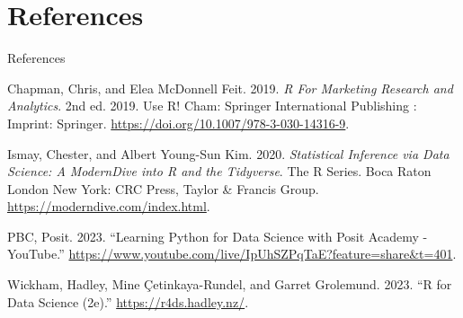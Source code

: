 \documentclass[
  ignorenonframetext,
]{beamer}
\newlength{\cslhangindent}
\newenvironment{CSLReferences}[2] %
 {\begin{list}{}{%
  \setlength{\itemindent}{0pt}
  \setlength{\leftmargin}{0pt}
  \setlength{\parsep}{0pt}
  \ifodd #1
   \setlength{\leftmargin}{\cslhangindent}
   \setlength{\itemindent}{-1\cslhangindent}
  \fi
  \setlength{\itemsep}{#2\baselineskip}}}
 {\end{list}}
\begin{document}
\section*{References}\label{references}

\begin{frame}[allowframebreaks]{References}
\label{refs}
\begin{CSLReferences}{1}{0}
Chapman, Chris, and Elea McDonnell Feit. 2019. \emph{R {For} {Marketing}
{Research} and {Analytics}}. 2nd ed. 2019. Use {R}! Cham: Springer
International Publishing : Imprint: Springer.
\url{https://doi.org/10.1007/978-3-030-14316-9}.

Ismay, Chester, and Albert Young-Sun Kim. 2020. \emph{Statistical
Inference via Data Science: A {ModernDive} into {R} and the Tidyverse}.
The {R} Series. Boca Raton London New York: CRC Press, Taylor \& Francis
Group. \url{https://moderndive.com/index.html}.

PBC, Posit. 2023. {``Learning {Python} for {Data} {Science} with {Posit}
{Academy} - {YouTube}.''}
\url{https://www.youtube.com/live/IpUhSZPqTaE?feature=share&t=401}.

Wickham, Hadley, Mine Çetinkaya-Rundel, and Garret Grolemund. 2023. {``R
for {Data} {Science} (2e).''} \url{https://r4ds.hadley.nz/}.

\end{CSLReferences}
\end{frame}
\end{document}
